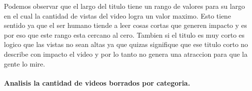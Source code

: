             \begin{figure}[ht]
            \end{figure}
        \FloatBarrier
        Podemos observar que el largo del titulo tiene un rango de valores para
        su largo en el cual la cantidad de vistas del video logra un valor maximo.
        Esto tiene sentido ya que el ser humano tiende a leer cosas cortas que
        generen impacto y es por eso que este rango esta cercano al cero. Tambien
        si el titulo es muy corto es logico que las vistas no sean altas ya que quizas
        signifique que ese titulo corto no describe con impacto el video y por lo tanto
        no genera una atraccion para que la gente lo mire.
        \newpage

        \paragraph{Analisis la cantidad de videos borrados por categoria.}

